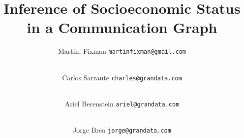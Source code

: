 



\title{Inference of Socioeconomic Status in a Communication Graph}
\author{
	Martin, Fixman
	\texttt{martinfixman@gmail.com}
	\and \\
	Carlos Sarraute
	\texttt{charles@grandata.com}
	\and \\
	Ariel Berenstein
	\texttt{ariel@grandata.com}
	\and \\
	Jorge Brea
	\texttt{jorge@grandata.com}
}
\maketitle

\begin{abstract}
	
\end{abstract}




\newpage


{}


